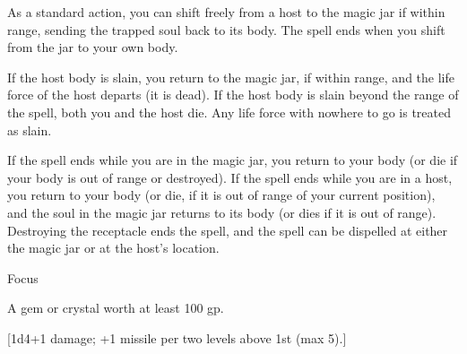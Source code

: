{	As a standard action, you can shift freely from a host to the magic jar if within range, sending the trapped soul back to its body. The spell ends when you shift from the jar to your own body.


	If the host body is slain, you return to the magic jar, if within range, and the life force of the host departs (it is dead). If the host body is slain beyond the range of the spell, both you and the host die. Any life force with nowhere to go is treated as slain.


	If the spell ends while you are in the magic jar, you return to your body (or die if your body is out of range or destroyed). If the spell ends while you are in a host, you return to your body (or die, if it is out of range of your current position), and the soul in the magic jar returns to its body (or dies if it is out of range). Destroying the receptacle ends the spell, and the spell can be dispelled at either the magic jar or at the host's location.

Focus

	A gem or crystal worth at least 100 gp.
}
        
[1d4+1 damage; +1 missile per two levels above 1st (max 5).]
        

